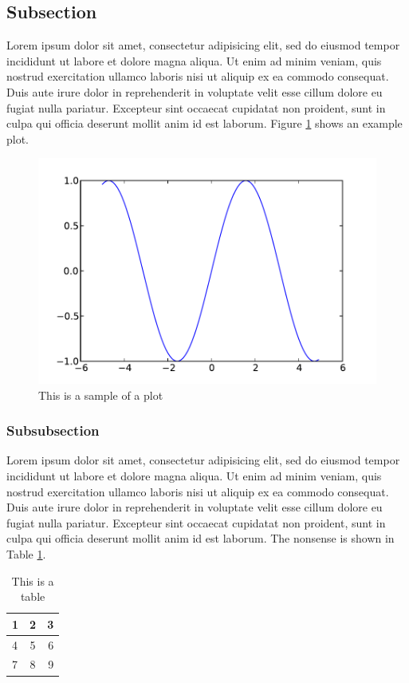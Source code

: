 \documentclass[letterpaper, english]{UCFthesis}
\begin{document}
\subsection{Subsection}
Lorem ipsum dolor sit amet, consectetur adipisicing elit, sed do eiusmod tempor incididunt ut labore et dolore magna aliqua. Ut enim ad minim veniam, quis nostrud exercitation ullamco laboris nisi ut aliquip ex ea commodo consequat. Duis aute irure dolor in reprehenderit in voluptate velit esse cillum dolore eu fugiat nulla pariatur. Excepteur sint occaecat cupidatat non proident, sunt in culpa qui officia deserunt mollit anim id est laborum.  Figure \ref{plot} shows an example plot.

\begin{figure}[ht]
\includegraphics[width=1\linewidth]{plot.pdf}
\caption{This is a sample of a plot}
\label{plot}
\end{figure}

\subsubsection{Subsubsection}
Lorem ipsum dolor sit amet, consectetur adipisicing elit, sed do eiusmod tempor incididunt ut labore et dolore magna aliqua. Ut enim ad minim veniam, quis nostrud exercitation ullamco laboris nisi ut aliquip ex ea commodo consequat. Duis aute irure dolor in reprehenderit in voluptate velit esse cillum dolore eu fugiat nulla pariatur. Excepteur sint occaecat cupidatat non proident, sunt in culpa qui officia deserunt mollit anim id est laborum.  The nonsense is shown in Table \ref{table}.

\begin{table}[ht]
\caption{This is a table}
\label{table}
\begin{tabular}{ l c r }
  1 & 2 & 3 \\ \hline
  4 & 5 & 6 \\
  7 & 8 & 9 \\
\end{tabular}
\end{table}
	
\end{document}
